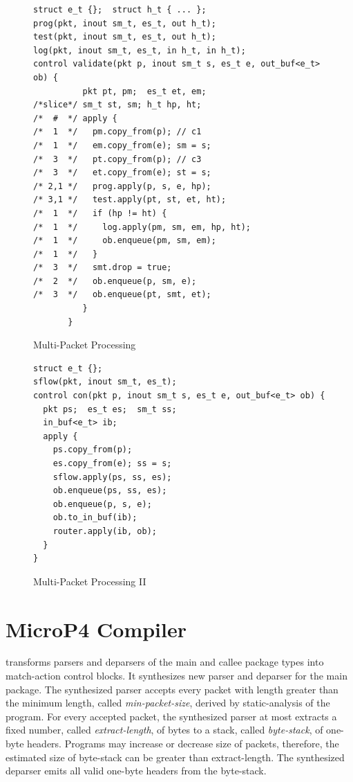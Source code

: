 \documentclass[letterpaper,twocolumn,10pt]{article}
\begin{document}
\begin{figure}[!h]
 \begin{lstlisting}[frame=none]
struct e_t {};  struct h_t { ... };
prog(pkt, inout sm_t, es_t, out h_t);
test(pkt, inout sm_t, es_t, out h_t);
log(pkt, inout sm_t, es_t, in h_t, in h_t);
control validate(pkt p, inout sm_t s, es_t e, out_buf<e_t> ob) {
          pkt pt, pm;  es_t et, em;  
/*slice*/ sm_t st, sm; h_t hp, ht;
/*  #  */ apply {
/*  1  */   pm.copy_from(p); // c1
/*  1  */   em.copy_from(e); sm = s;
/*  3  */   pt.copy_from(p); // c3 
/*  3  */   et.copy_from(e); st = s;
/* 2,1 */   prog.apply(p, s, e, hp); 
/* 3,1 */   test.apply(pt, st, et, ht); 
/*  1  */   if (hp != ht) {
/*  1  */     log.apply(pm, sm, em, hp, ht);
/*  1  */     ob.enqueue(pm, sm, em);
/*  1  */   }
/*  3  */   smt.drop = true;
/*  2  */   ob.enqueue(p, sm, e);
/*  3  */   ob.enqueue(pt, smt, et);
          }
       }
\end{lstlisting}
\caption{Multi-Packet Processing}
\label{fig:multi-packet-processing}

\begin{lstlisting}[frame=none]
struct e_t {};
sflow(pkt, inout sm_t, es_t);
control con(pkt p, inout sm_t s, es_t e, out_buf<e_t> ob) {
  pkt ps;  es_t es;  sm_t ss;
  in_buf<e_t> ib;
  apply {
    ps.copy_from(p);
    es.copy_from(e); ss = s;
    sflow.apply(ps, ss, es); 
    ob.enqueue(ps, ss, es);
    ob.enqueue(p, s, e);
    ob.to_in_buf(ib);
    router.apply(ib, ob);
  }
}
\end{lstlisting}
\caption{Multi-Packet Processing II}
\label{fig:multi-packet-processing-II}
\end{figure}


\section{MicroP4 Compiler}
\label{sec:compiler}
\ucomp transforms parsers and deparsers of the main and callee package types into match-action control blocks.
It synthesizes new parser and deparser for the main package.
The synthesized parser accepts every packet with length greater than the minimum length, called \emph{min-packet-size}, derived by static-analysis of the program.
For every accepted packet, the synthesized parser at most extracts a fixed number, called \emph{extract-length}, of bytes to a stack, called \emph{byte-stack}, of one-byte headers.
Programs may increase or decrease size of packets, therefore, the estimated size of byte-stack can be greater than extract-length.
The synthesized deparser emits all valid one-byte headers from the byte-stack.
\end{document}
